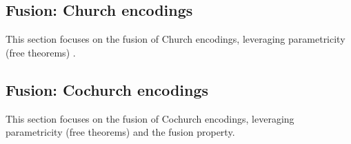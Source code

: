 \subsection{Fusion: Church encodings}
This section focuses on the fusion of Church encodings, leveraging parametricity (free theorems) \citep{Wadler1989}.



% 


\subsection{Fusion: Cochurch encodings}
This section focuses on the fusion of Cochurch encodings, leveraging parametricity (free theorems) and the fusion property.


